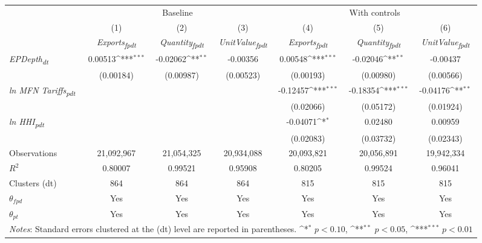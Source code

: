 {
\def\sym#1{\ifmmode^{#1}\else\(^{#1}\)\fi}
\begin{tabular}{l*{6}{c}}
\toprule
&\multicolumn{3}{c}{Baseline}&\multicolumn{3}{c}{With controls}\\\cmidrule(lr){2-4}\cmidrule(lr){5-7}
&(1)&(2)&(3)&(4)&(5)&(6)\\
&\textit{Exports\textsubscript{fpdt}}&\textit{Quantity\textsubscript{fpdt}}&\textit{UnitValue\textsubscript{fpdt}}&\textit{Exports\textsubscript{fpdt}}&\textit{Quantity\textsubscript{fpdt}}&\textit{UnitValue\textsubscript{fpdt}}\\
\midrule
\textit{EPDepth\textsubscript{dt}} & 0.00513\sym{***} & -0.02062\sym{**} & -0.00356 & 0.00548\sym{***} & -0.02046\sym{**} & -0.00437\\
 & (0.00184) & (0.00987) & (0.00523) & (0.00193) & (0.00980) & (0.00566)\\
\addlinespace
\textit{ln MFN Tariffs\textsubscript{pdt}} &  &  &  & -0.12457\sym{***} & -0.18354\sym{***} & -0.04176\sym{**}\\
 &  &  &  & (0.02066) & (0.05172) & (0.01924)\\
\addlinespace
\textit{ln HHI\textsubscript{pdt}} &  &  &  & -0.04071\sym{*} & 0.02480 & 0.00959\\
 &  &  &  & (0.02083) & (0.03732) & (0.02343)\\
\midrule
Observations & 21,092,967 & 21,054,325 & 20,934,088 & 20,093,821 & 20,056,891 & 19,942,334\\
$R^{2}$ & 0.80007 & 0.99521 & 0.95908 & 0.80205 & 0.99524 & 0.96041\\
Clusters (dt) & 864 & 864 & 864 & 815 & 815 & 815\\
$\theta_{fpd}$ & Yes & Yes & Yes & Yes & Yes & Yes\\
$\theta_{pt}$ & Yes & Yes & Yes & Yes & Yes & Yes\\
\bottomrule
\multicolumn{7}{l}{\footnotesize \textit{Notes}: Standard errors clustered at the (dt) level are reported in parentheses. \sym{*} \(p<0.10\), \sym{**} \(p<0.05\), \sym{***} \(p<0.01\)}\\
\end{tabular}
}
